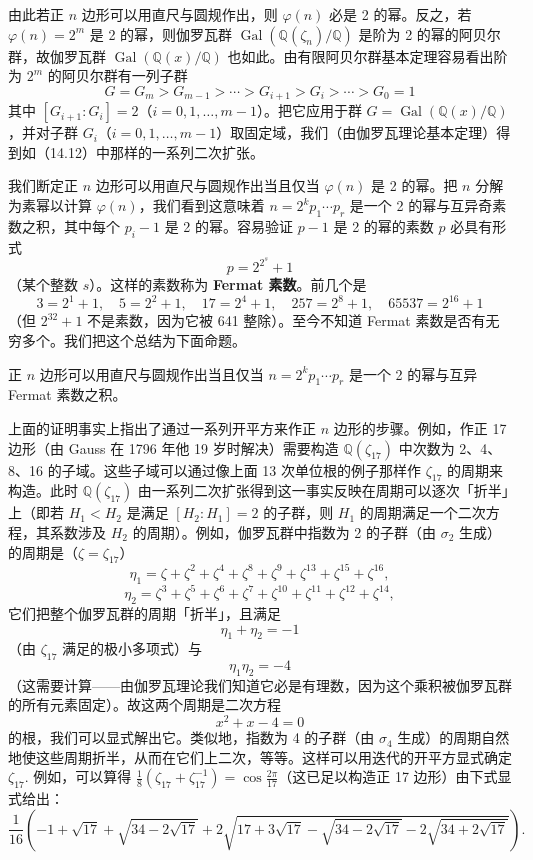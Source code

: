 由此若正 \(n\) 边形可以用直尺与圆规作出，则 \(\varphi(n)\) 必是 2 的幂。反之，若 \(\varphi(n) = 2^m\) 是 2 的幂，则伽罗瓦群 \(\operatorname{Gal}(\mathbb{Q}(\zeta_n)/\mathbb{Q})\) 是阶为 2 的幂的阿贝尔群，故伽罗瓦群 \(\operatorname{Gal}(\mathbb{Q}(x)/\mathbb{Q})\) 也如此。由有限阿贝尔群基本定理容易看出阶为 \(2^m\) 的阿贝尔群有一列子群
\[
G = G_m > G_{m-1} > \cdots > G_{i+1} > G_i > \cdots > G_0 = 1
\]
其中 \([G_{i+1}:G_i] = 2\)（\(i = 0, 1, \ldots, m-1\)）。把它应用于群 \(G = \operatorname{Gal}(\mathbb{Q}(x)/\mathbb{Q})\)，并对子群 \(G_i\)（\(i = 0, 1, \ldots, m-1\)）取固定域，我们（由伽罗瓦理论基本定理）得到如（14.12）中那样的一系列二次扩张。

我们断定正 \(n\) 边形可以用直尺与圆规作出当且仅当 \(\varphi(n)\) 是 2 的幂。把 \(n\) 分解为素幂以计算 \(\varphi(n)\)，我们看到这意味着 \(n = 2^kp_1\cdots p_r\) 是一个 2 的幂与互异奇素数之积，其中每个 \(p_i-1\) 是 2 的幂。容易验证 \(p-1\) 是 2 的幂的素数 \(p\) 必具有形式
\[
p = 2^{2^s}+1
\]
（某个整数 \(s\)）。这样的素数称为 \textbf{Fermat 素数}。前几个是
\[
3 = 2^1+1, \quad 5 = 2^2+1, \quad 17 = 2^4+1, \quad 257 = 2^8+1, \quad 65537 = 2^{16}+1
\]
（但 \(2^{32}+1\) 不是素数，因为它被 641 整除）。至今不知道 Fermat 素数是否有无穷多个。我们把这个总结为下面命题。

\begin{proposition}\label{pro:14.29}
正 \(n\) 边形可以用直尺与圆规作出当且仅当 \(n = 2^kp_1\cdots p_r\) 是一个 2 的幂与互异 Fermat 素数之积。
\end{proposition}

上面的证明事实上指出了通过一系列开平方来作正 \(n\) 边形的步骤。例如，作正 17 边形（由 Gauss 在 1796 年他 19 岁时解决）需要构造 \(\mathbb{Q}(\zeta_{17})\) 中次数为 2、4、8、16 的子域。这些子域可以通过像上面 13 次单位根的例子那样作 \(\zeta_{17}\) 的周期来构造。此时 \(\mathbb{Q}(\zeta_{17})\) 由一系列二次扩张得到这一事实反映在周期可以逐次「折半」上（即若 \(H_1 < H_2\) 是满足 \([H_2:H_1] = 2\) 的子群，则 \(H_1\) 的周期满足一个二次方程，其系数涉及 \(H_2\) 的周期）。例如，伽罗瓦群中指数为 2 的子群（由 \(\sigma_2\) 生成）的周期是（\(\zeta = \zeta_{17}\)）
\[
\eta_1 = \zeta+\zeta^2+\zeta^4+\zeta^8+\zeta^9+\zeta^{13}+\zeta^{15}+\zeta^{16},
\]
\[
\eta_2 = \zeta^3+\zeta^5+\zeta^6+\zeta^7+\zeta^{10}+\zeta^{11}+\zeta^{12}+\zeta^{14},
\]
它们把整个伽罗瓦群的周期「折半」，且满足
\[
\eta_1+\eta_2 = -1
\]
（由 \(\zeta_{17}\) 满足的极小多项式）与
\[
\eta_1\eta_2 = -4
\]
（这需要计算——由伽罗瓦理论我们知道它必是有理数，因为这个乘积被伽罗瓦群的所有元素固定）。故这两个周期是二次方程
\[
x^2+x-4 = 0
\]
的根，我们可以显式解出它。类似地，指数为 4 的子群（由 \(\sigma_4\) 生成）的周期自然地使这些周期折半，从而在它们上二次，等等。这样可以用迭代的开平方显式确定 \(\zeta_{17}\). 例如，可以算得 \(\frac{1}{8}(\zeta_{17}+\zeta_{17}^{-1}) = \cos\frac{2\pi}{17}\)（这已足以构造正 17 边形）由下式显式给出：
\[
\frac{1}{16}\left(-1+\sqrt{17}+\sqrt{34-2\sqrt{17}}+2\sqrt{17+3\sqrt{17}-\sqrt{34-2\sqrt{17}}-2\sqrt{34+2\sqrt{17}}}\right).
\]


